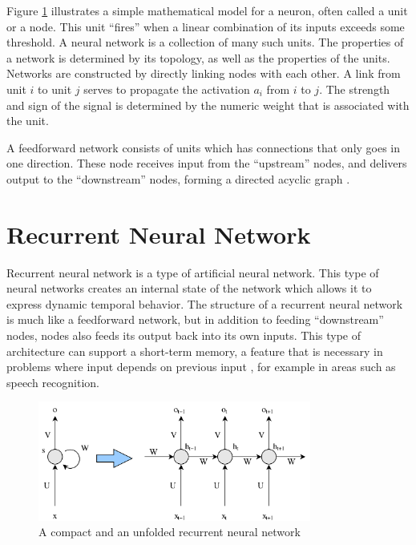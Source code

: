Figure \ref{fig:nn-rnn} illustrates a simple mathematical model for a neuron, often called a unit or a node. This unit ``fires'' when a linear combination of its inputs exceeds some threshold. A neural network is a collection of many such units. The properties of a network is determined by its topology, as well as the properties of the units. Networks are constructed by directly linking nodes with each other. A link from unit \(i\) to unit \(j\) serves to propagate the activation \(a_{i}\) from \(i\) to \(j\). The strength and sign of the signal is determined by the numeric weight that is associated with the unit. 

A feedforward network consists of units which has connections that only goes in one direction. These node receives input from the ``upstream'' nodes, and delivers output to the ``downstream'' nodes, forming a directed acyclic graph \citep{russell2010aimodernapproach}.


\section{Recurrent Neural Network}
\label{sec:reccurent_neural_network}
Recurrent neural network is a type of artificial neural network. This type of neural networks creates an internal state of the network which allows it to express dynamic temporal behavior. The structure of a recurrent neural network is much like a feedforward network, but in addition to feeding ``downstream'' nodes, nodes also feeds its output back into its own inputs. This type of architecture can support a short-term memory, a feature that is necessary in problems where input depends on previous input \citep{russell2010aimodernapproach}, for example in areas such as speech recognition.

\begin{figure}[ht]
    \centering
    \includegraphics[width=0.8\textwidth]{fig/related_work/nn_recurrent.png}
    \caption{A compact and an unfolded recurrent neural network}
    \label{fig:nn-rnn}
\end{figure}

